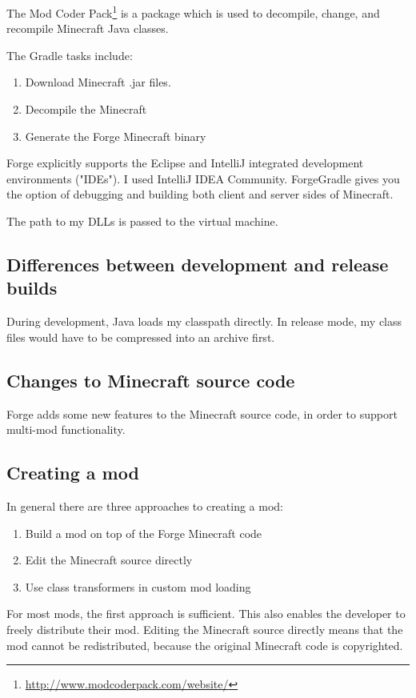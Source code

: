 \documentclass[]{article}
\begin{document}
The Mod Coder Pack\footnote{\url{http://www.modcoderpack.com/website/}} is a package which is used to decompile, change, and recompile Minecraft Java classes.

The Gradle tasks include:
\begin{enumerate}
  \item Download Minecraft .jar files.
  \item Decompile the Minecraft 
  \item Generate the Forge Minecraft binary
\end{enumerate}

Forge explicitly supports the Eclipse and IntelliJ integrated development environments ("IDEs").
I used IntelliJ IDEA Community.
ForgeGradle gives you the option of debugging and building both client and server sides of Minecraft.

The path to my DLLs is passed to the virtual machine.

\subsection{Differences between development and release builds}
During development, Java loads my classpath directly.
In release mode, my class files would have to be compressed into an archive first.

\subsection{Changes to Minecraft source code}
Forge adds some new features to the Minecraft source code, in order to support multi-mod functionality.

\subsection{Creating a mod}
In general there are three approaches to creating a mod:
\begin{enumerate}
  \item Build a mod on top of the Forge Minecraft code
  \item Edit the Minecraft source directly
  \item Use class transformers in custom mod loading
\end{enumerate}
For most mods, the first approach is sufficient.
This also enables the developer to freely distribute their mod.
Editing the Minecraft source directly means that the mod cannot be redistributed, because the original Minecraft code is copyrighted.
\end{document}
